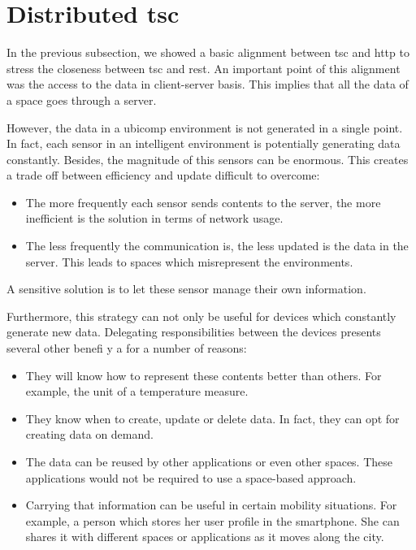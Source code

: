 \section{Distributed \ac{tsc}}
\label{sec:distributed_tsc}

In the previous subsection, we showed a basic alignment between \ac{tsc} and \ac{http} to stress the closeness between \ac{tsc} and \ac{rest}.
An important point of this alignment was the access to the data in client-server basis.
This implies that all the data of a space goes through a server. %

However, the data in a \ac{ubicomp} environment is not generated in a single point.
In fact, each sensor in an intelligent environment is potentially generating data constantly.
Besides, the magnitude of this sensors can be enormous.
This creates a trade off between efficiency and update difficult to overcome:
\begin{itemize}
  \item The more frequently each sensor sends contents to the server, the more inefficient is the solution in terms of network usage.
  \item The less frequently the communication is, the less updated is the data in the server.
        This leads to spaces which misrepresent the environments.
\end{itemize}
A sensitive solution is to let these sensor manage their own information.

Furthermore, this strategy can not only be useful for devices which constantly generate new data.
Delegating responsibilities between the devices presents several other benefi y a for a number of reasons:
\begin{itemize}
  \item They will know how to represent these contents better than others. %
	For example, the unit of a temperature measure.
  \item They know when to create, update or delete data. %
        In fact, they can opt for creating data on demand.
  \item The data can be reused by other applications or even other spaces. %
        These applications would not be required to use a space-based approach.
  \item Carrying that information can be useful in certain mobility situations.
        For example, a person which stores her user profile in the smartphone.
        She can shares it with different spaces or applications as it moves along the city.
\end{itemize}


